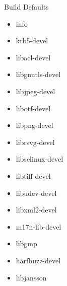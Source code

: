 \begin{frame}{Build Defaults}
  \begin{itemize}
  \item{info}
  \item{krb5-devel}
  \item{libacl-devel}
  \item{libgnutls-devel}
  \item{libjpeg-devel}
  \item{libotf-devel}
  \item{libpng-devel}
  \item{librsvg-devel}
  \item{libselinux-devel}
  \item{libtiff-devel}
  \item{libudev-devel}
  \item{libxml2-devel}
  \item{m17n-lib-devel}
  \item{libgmp}
  \item{harfbuzz-devel}
  \item{libjansson}
  \end{itemize}
\end{frame}

